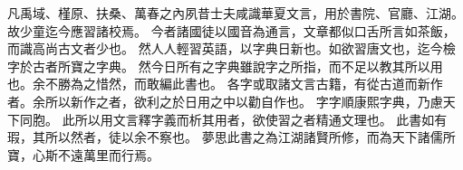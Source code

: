 凡禹域、槿原、扶桑、萬春之內夙昔士夫咸識華夏文言，用於書院、官廳、江湖。故少童迄今應習諸校焉。
今者諸國徒以國音為通言，文章都似口舌所言如茶飯，而識高尚古文者少也。
然人人輕習英語，以字典日新也。如欲習唐文也，迄今檢字於古者所寶之字典。
然今日所有之字典雖說字之所指，而不足以教其所以用也。余不勝為之惜然，而敢編此書也。
各字或取諸文言古籍，有從古道而新作者。余所以新作之者，欲利之於日用之中以勸自作也。
字字順康熙字典，乃慮天下同胞。
此所以用文言釋字義而析其用者，欲使習之者精通文理也。
此書如有瑕，其所以然者，徒以余不察也。
夢思此書之為江湖諸賢所修，而為天下諸儒所寶，心斯不遠萬里而行焉。
